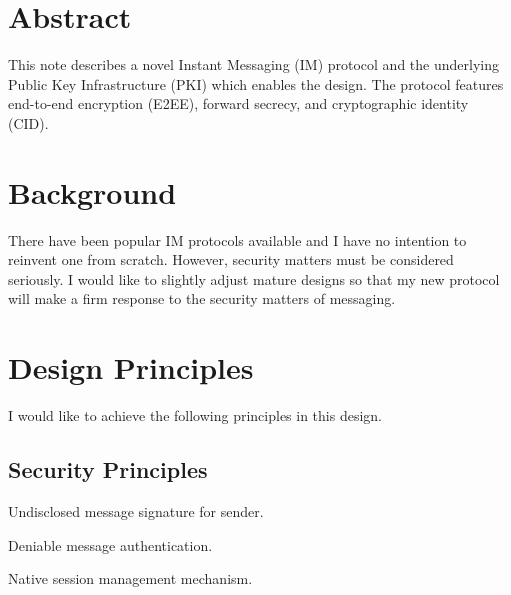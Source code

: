 
\linespread{1.1}








\fulldoctitle



\section*{Abstract}

This note describes a novel Instant Messaging (IM) protocol and the underlying Public Key Infrastructure (PKI) which enables the design.
The protocol features end-to-end encryption (E2EE), forward secrecy, and cryptographic identity (CID).



\Nmaketoc













\section{Background}

There have been popular IM protocols available and I have no intention to reinvent one from scratch.
However, security matters must be considered seriously.
I would like to slightly adjust mature designs so that my new protocol will make a firm response to the security matters of messaging.










\section{Design Principles}

I would like to achieve the following principles in this design.

\subsection{Security Principles}

\begin{compactitem}
	\item Undisclosed message signature for sender.
	\item Deniable message authentication.
	\item Native session management mechanism.
\end{compactitem}

